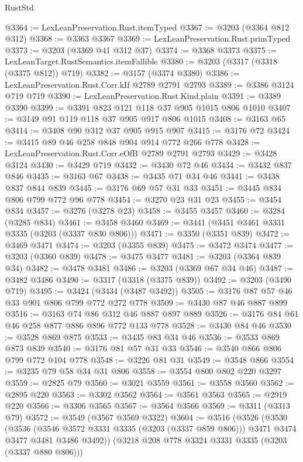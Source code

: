 \begin{lexlean}{RustStd}
\begin{coremodule}
{\begin{coremodule}
{{{{{{{{{{{{{{{@3364 := LexLeanPreservation.Rust.itemTyped
@3367 := @3203 (@3364 @812 @312)
@3368 := @3363 @3367
@3369 := LexLeanPreservation.Rust.primTyped
@3373 := @3203 (@3369 @41 @312 @37)
@3374 := @3368 @3373
@3375 := LexLeanTarget.RustSemantics.itemFallible
@3380 := @3203 (@3317 (@3318 (@3375 @812)) @719)
@3382 := @3157 (@3374 @3380)
@3386 := LexLeanPreservation.Rust.Corr.kIf @2789 @2791 @2793
@3389 := @3386 @3124 @719 @719
@3390 := LexLeanPreservation.Rust.Kind.plain
@3391 := @3389 @3390
@3399 := @3391 @823 @121 @118 @37 @905 @1015 @806 @1010
@3407 := @3149 @91 @119 @118 @37 @905 @917 @806 @1015
@3408 := @3163 @65
@3414 := @3408 @90 @312 @37 @905 @915 @907
@3415 := @3176 @72
@3424 := @3415 @89 @46 @258 @848 @904 @914 @772 @266 @778
@3428 := LexLeanPreservation.Rust.Corr.eOfB @2789 @2791 @2793
@3429 := @3428 @3124
@3430 := @3429 @719
@3432 := @3430 @72 @46
@3434 := @3432 @837 @846
@3435 := @3163 @67
@3438 := @3435 @71 @34 @46
@3441 := @3438 @837 @844 @839
@3445 := @3176 @69 @57 @31 @33
@3451 := @3445 @834 @806 @799 @772 @96 @778
@3454 := @3270 @23 @31 @23
@3455 := @3454 @834
@3457 := @3276 (@3278 @23)
@3458 := @3455 @3457
@3460 := @3284 (@3285 @834)
@3461 := @3458 @3460
@3469 := @3441 (@3451 @3461 @3331 @3335 (@3203 (@3337 @830 @806)))
@3471 := @3350 (@3351 @839)
@3472 := @3469 @3471
@3474 := @3203 (@3355 @839)
@3475 := @3472 @3474
@3477 := @3203 (@3360 @839)
@3478 := @3475 @3477
@3481 := @3203 (@3364 @839 @34)
@3482 := @3478 @3481
@3486 := @3203 (@3369 @67 @34 @46)
@3487 := @3482 @3486
@3490 := @3317 (@3318 (@3375 @839))
@3492 := @3203 (@3490 @719)
@3495 := @3424 (@3434 (@3487 @3492))
@3505 := @3176 @87 @57 @46 @33 @901 @806 @799 @772 @272 @778
@3509 := @3430 @87 @46 @887 @899
@3516 := @3163 @74 @86 @312 @46 @887 @897 @889
@3526 := @3176 @84 @61 @46 @258 @877 @886 @896 @772 @133 @778
@3528 := @3430 @84 @46
@3530 := @3528 @869 @875
@3533 := @3435 @83 @34 @46
@3536 := @3533 @869 @873 @839
@3540 := @3176 @81 @57 @31 @33
@3546 := @3540 @866 @806 @799 @772 @104 @778
@3548 := @3226 @81 @31
@3549 := @3548 @866
@3554 := @3235 @79 @58 @34 @31 @806
@3558 := @3554 @800 @802 @220 @3297
@3559 := @2825 @79
@3560 := @3021 @3559
@3561 := @3558 @3560
@3562 := @2895 @220
@3563 := @3302 @3562
@3564 := @3561 @3563
@3565 := @2919 @220
@3566 := @3306 @3565
@3567 := @3564 @3566
@3569 := @3311 (@3313 @79)
@3572 := @3549 (@3567 @3569 @3322)
@3604 := @3516
    (@3526
      (@3530
        (@3536
          (@3546 @3572 @3331 @3335 (@3203 (@3337 @859 @806)))
          @3471
          @3474
          @3477
          @3481
          @3486
          @3492))
      (@3218 @208 @778 @3324 @3331 @3335 (@3203 (@3337 @880 @806)))
}}}}}}}}}}}}}}}
\end{coremodule}}
\end{coremodule}
\end{lexlean}
